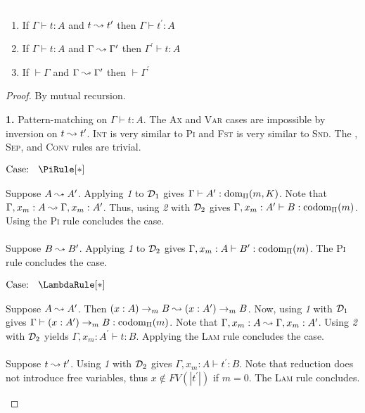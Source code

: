 \begin{lemma}
    \label{lem:2:preservation_no_type_step}
    \textcolor{white}{\_}
    \begin{enumerate}
        \item If $\Gamma \vdash t : A$ and $t \leadsto t^\prime$ then $\Gamma \vdash t^\prime : A$
        \item If $\Gamma \vdash t : A$ and $\Gamma \leadsto \Gamma^\prime$ then $\Gamma^\prime \vdash t : A$
        \item If $\vdash \Gamma$ and $\Gamma \leadsto \Gamma^\prime$ then $\vdash \Gamma^\prime$
    \end{enumerate}
\end{lemma}
\begin{proof}
    By mutual recursion.

    \noindent \textbf{1.} Pattern-matching on $\Gamma \vdash t : A$.
    The \textsc{Ax} and \textsc{Var} cases are impossible by inversion on $t \leadsto t^\prime$.
    \textsc{Int} is very similar to \textsc{Pi} and \textsc{Fst} is very similar to \textsc{Snd}.
    The , \textsc{Sep}, and \textsc{Conv} rules are trivial.

    $\text{Case: }\begin{array}{c} \PiRule[*] \end{array}$
    \begin{proofcase}
        Suppose $A \leadsto A^\prime$.
        Applying \textit{1} to $\mathcal{D}_{1}$ gives $\Gamma \vdash A^\prime : \textnormal{dom}_\Pi(m, K)$.
        Note that $\Gamma, x_m : A \leadsto \Gamma, x_m : A^\prime$.
        Thus, using \textit{2} with $\mathcal{D}_{2}$ gives $\Gamma, x_m : A^\prime \vdash B : \textnormal{codom}_\Pi(m)$.
        Using the \textsc{Pi} rule concludes the case.
        \\ \\
        Suppose $B \leadsto B^\prime$.
        Applying \textit{1} to $\mathcal{D}_{2}$ gives $\Gamma, x_m : A \vdash B^\prime : \textnormal{codom}_\Pi(m)$.
        The \textsc{Pi} rule concludes the case.
    \end{proofcase}

    $\text{Case: }\begin{array}{c} \LambdaRule[*] \end{array}$
    \begin{proofcase}
        Suppose $A \leadsto A^\prime$.
        Then $(x : A) \to_m B \leadsto (x : A^\prime) \to_m B$.
        Now, using \textit{1} with $\mathcal{D}_{1}$ gives $\Gamma \vdash (x : A^\prime) \to_m B : \textnormal{codom}_\Pi(m)$.
        Note that $\Gamma, x_m : A \leadsto \Gamma, x_m : A^\prime$.
        Using \textit{2} with $\mathcal{D}_{2}$ yields $\Gamma, x_m : A^\prime \vdash t : B$.
        Applying the \textsc{Lam} rule concludes the case.
        \\ \\
        Suppose $t \leadsto t^\prime$.
        Using \textit{1} with $\mathcal{D}_{2}$ gives $\Gamma, x_m : A \vdash t^\prime : B$.
        Note that reduction does not introduce free variables, thus $x \notin FV(|t^\prime|)$ if $m = 0$.
        The \textsc{Lam} rule concludes.
    \end{proofcase}


\end{proof}
